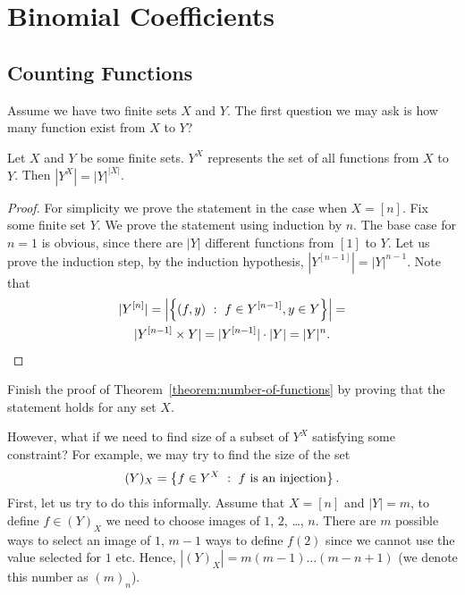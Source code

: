 \chapter{Binomial Coefficients}
\section{Counting Functions}
Assume we have two finite sets $X$ and $Y$. The first question we may ask is
how many function exist from $X$ to $Y$?


\begin{theorem}
\label{theorem:number-of-functions}
  Let $X$ and $Y$ be some finite sets. $Y^X$ represents the set of all
  functions from $X$ to $Y$. Then $|Y^X| = |Y|^{|X|}$.
\end{theorem}
\begin{proof}
  For simplicity we prove the statement in the case when $X = [n]$. Fix some
  finite set $Y$. We prove the statement using induction by $n$. The base case
  for $n = 1$ is obvious, since there are $|Y|$ different functions from $[1]$
  to $Y$. Let us prove the induction step, by the induction hypothesis,
  $|Y^{[n - 1]}| = |Y|^{n - 1}$. Note that
  \begin{multline*}
    |Y^{[n]}| = \left| \set[f \in Y^{[ n - 1]}, y \in Y]{(f, y)} \right| = \\
    |Y^{[n - 1]} \times Y| = |Y^{[n - 1]}| \cdot |Y| = |Y|^n.
  \end{multline*}
\end{proof}

\begin{exercise}
  Finish the proof of Theorem~\ref{theorem:number-of-functions} by proving that
  the statement holds for any set $X$.
\end{exercise}

However, what if we need to find size of a subset of $Y^X$ satisfying some
constraint? For example, we may try to find the size of the set
\[
  (Y)_X = \set[f\text{ is an injection}]{f \in Y^X}.
\]
First, let us try to do this informally. Assume that $X = [n]$ and $|Y| = m$,
to define $f \in (Y)_X$ we need to choose images of $1$, $2$, \dots, $n$. There
are $m$ possible ways to select an image of $1$, $m - 1$ ways to define $f(2)$
since we cannot use the value selected for $1$ etc. Hence,
$|(Y)_X| = m (m - 1) \dots (m - n + 1)$ (we denote this number as $(m)_n$).

